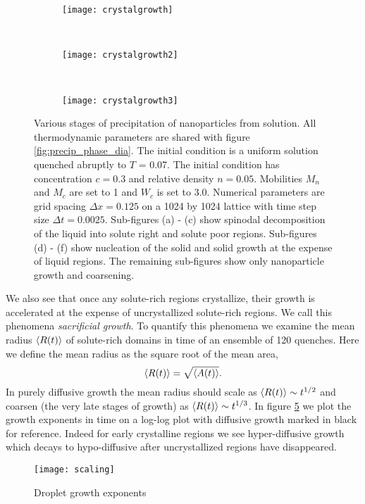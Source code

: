 \begin{figure}
    \vspace{0.25cm}
    \begin{subfigure}[b]{0.3\textwidth}
        \texttt{[image: crystalgrowth]}
        \label{fig:crystalgrowth}
        \caption{}
    \end{subfigure}
    ~
    \begin{subfigure}[b]{0.3\textwidth}
        \texttt{[image: crystalgrowth2]}
        \label{fig:crystalgrowth2}
        \caption{}
    \end{subfigure}
    ~ 
    \begin{subfigure}[b]{0.3\textwidth}
        \texttt{[image: crystalgrowth3]}
        \label{fig:crystalgrowth3}
        \caption{}
    \end{subfigure}
    \caption[Stages of precipitation of nanoparticles from solution]{
        \label{fig:precipitation}
        Various stages of precipitation of nanoparticles from solution. All
        thermodynamic parameters are shared with figure
        \ref{fig:precip_phase_dia}. The initial condition is a uniform solution
        quenched abruptly to $T$ = 0.07. The initial condition has
        concentration $c = 0.3$ and relative density $n = 0.05$. Mobilities
        $M_n$ and $M_c$ are set to 1 and $W_c$ is set to 3.0. Numerical
        parameters are grid spacing $\Delta x = 0.125$ on a 1024 by 1024
        lattice with time step size $\Delta t = 0.0025$. Sub-figures (a) - (c)
        show spinodal decomposition of the liquid into solute right and solute
        poor regions. Sub-figures (d) - (f) show nucleation of the solid and
        solid growth at the expense of liquid regions.  The remaining
        sub-figures show only nanoparticle growth and coarsening.
    }
\end{figure}
%
We also see that once any solute-rich regions crystallize, their growth is
accelerated at the expense of uncrystallized solute-rich regions. We call this
phenomena \textit{sacrificial growth}. 
%
%
To quantify this phenomena we examine the mean radius $\left\langle R(t) \right\rangle$ of
solute-rich domains in time of an ensemble of 120 quenches. Here we define the
mean radius as the square root of the mean area,
%
\begin{equation}
    \left\langle R(t) \right\rangle = \sqrt{\left\langle A(t) \right\rangle}.
\end{equation}
%
In purely diffusive growth the mean radius should scale as $\left\langle R(t) \right\rangle \sim
t^{1/2}$ and coarsen (the very late stages of growth) as $\left\langle R(t) \right\rangle \sim
t^{1/3}$. In figure \ref{fig:scaling} we plot the growth exponents in time on a
log-log plot with diffusive growth marked in black for reference. Indeed for
early crystalline regions we see hyper-diffusive growth which decays to
hypo-diffusive after uncrystallized regions have disappeared.
%
\begin{figure}
    \centering
    \texttt{[image: scaling]}
    \caption{
        \label{fig:scaling}
        Droplet growth exponents
    }
\end{figure}

